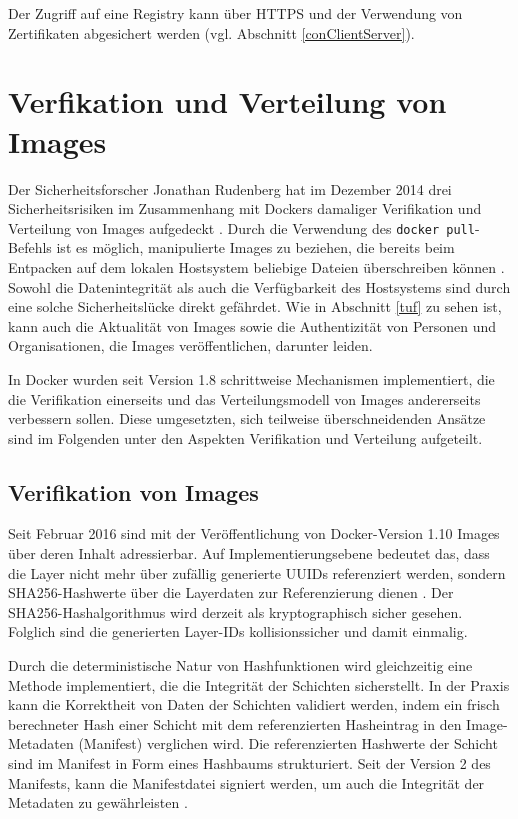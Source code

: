 \documentclass[../main.tex]{subfiles}
\begin{document}
    Der Zugriff auf eine Registry kann über \acrshort{HTTPS} und der Verwendung von Zertifikaten abgesichert werden \cite{dockerRegistry} (vgl. Abschnitt \ref{conClientServer}).

  \section{Verfikation und Verteilung von Images}
    Der Sicherheitsforscher Jonathan Rudenberg hat im Dezember 2014 drei Sicherheitsrisiken im Zusammenhang mit Dockers damaliger Verifikation und Verteilung von Images aufgedeckt \cite{githubRegistryV1Issues}\cite{registryV1IssuesRudenberg}. Durch die Verwendung des \texttt{docker pull}-Befehls ist es möglich, manipulierte Images zu beziehen, die bereits beim Entpacken auf dem lokalen Hostsystem beliebige Dateien überschreiben können \cite{registryV1IssuesRedHat}. Sowohl die Datenintegrität als auch die Verfügbarkeit des Hostsystems sind durch eine solche Sicherheitslücke direkt gefährdet. Wie in Abschnitt \ref{tuf} zu sehen ist, kann auch die Aktualität von Images sowie die Authentizität von Personen und Organisationen, die Images veröffentlichen, darunter leiden.

    In Docker wurden seit Version 1.8 schrittweise Mechanismen implementiert, die die Verifikation einerseits und das Verteilungsmodell von Images andererseits verbessern sollen. Diese umgesetzten, sich teilweise überschneidenden Ansätze sind im Folgenden unter den Aspekten Verifikation und Verteilung aufgeteilt.

    \subsection{Verifikation von Images}
      Seit Februar 2016 sind mit der Veröffentlichung von Docker-Version 1.10 Images über deren Inhalt adressierbar. Auf Implementierungsebene bedeutet das, dass die Layer nicht mehr über zufällig generierte \acrshort{UUID}s referenziert werden, sondern SHA256-Hashwerte über die Layerdaten zur Referenzierung dienen \cite[S.16]{slideshareImageDistribution}. Der SHA256-Hashalgorithmus wird derzeit als kryptographisch sicher gesehen. Folglich sind die generierten Layer-IDs kollisionssicher und damit einmalig.

      Durch die deterministische Natur von Hashfunktionen wird gleichzeitig eine Methode implementiert, die die Integrität der Schichten sicherstellt. In der Praxis kann die Korrektheit von Daten der Schichten validiert werden, indem ein frisch berechneter Hash einer Schicht mit dem referenzierten Hasheintrag in den Image-Metadaten (Manifest) verglichen wird. Die referenzierten Hashwerte der Schicht sind im Manifest in Form eines Hashbaums strukturiert. Seit der Version 2 des Manifests, kann die Manifestdatei signiert werden, um auch die Integrität der Metadaten zu gewährleisten \cite{githubImageManifest21}.
\end{document}
